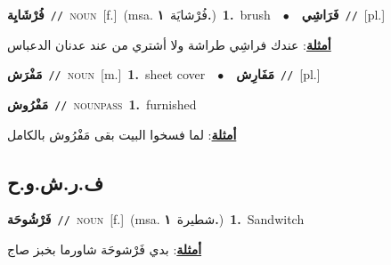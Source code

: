 \documentclass[10pt,a4paper,twoside]{article} %
\begin{document}
\begin{multicols}{2}
{\setlength\topsep{0pt}\textbf{\foreignlanguage{arabic}{فُرْشَايِة}}\ {\color{gray}\texttt{//}\color{black}}\ \textsc{noun}\ [f.]\ \color{gray}(msa. \foreignlanguage{arabic}{فُرْشايَة}~\foreignlanguage{arabic}{\textbf{١.}})\color{black}\ \textbf{1.}~brush\ \ $\bullet$\ \ \setlength\topsep{0pt}\textbf{\foreignlanguage{arabic}{فَرَاشِي}}\ {\color{gray}\texttt{//}\color{black}}\ [pl.]\  \begin{flushright}\color{gray}\foreignlanguage{arabic}{\textbf{\underline{\foreignlanguage{arabic}{أمثلة}}}: عندك فراشِي طراشة ولا أشتري من عند عدنان الدعباس}\end{flushright}\color{black}} \vspace{2mm}

{\setlength\topsep{0pt}\textbf{\foreignlanguage{arabic}{مَفْرَش}}\ {\color{gray}\texttt{//}\color{black}}\ \textsc{noun}\ [m.]\ \textbf{1.}~sheet cover\ \ $\bullet$\ \ \setlength\topsep{0pt}\textbf{\foreignlanguage{arabic}{مَفَارِش}}\ {\color{gray}\texttt{//}\color{black}}\ [pl.]\ } \vspace{2mm}

{\setlength\topsep{0pt}\textbf{\foreignlanguage{arabic}{مَفْرُوش}}\ {\color{gray}\texttt{//}\color{black}}\ \textsc{noun\textunderscore pass}\ \textbf{1.}~furnished\  \begin{flushright}\color{gray}\foreignlanguage{arabic}{\textbf{\underline{\foreignlanguage{arabic}{أمثلة}}}: لما فسخوا البيت بقى مَفْرُوش بالكامل}\end{flushright}\color{black}} \vspace{2mm}

\vspace{-3mm}
\subsection*{\color{blue}\foreignlanguage{arabic}{ف.ر.ش.و.ح}\color{blue}{ (ntws)}} 

{\setlength\topsep{0pt}\textbf{\foreignlanguage{arabic}{فَرْشُوحَة}}\ {\color{gray}\texttt{//}\color{black}}\ \textsc{noun}\ [f.]\ \color{gray}(msa. \foreignlanguage{arabic}{شطيرة}~\foreignlanguage{arabic}{\textbf{١.}})\color{black}\ \textbf{1.}~Sandwitch\  \begin{flushright}\color{gray}\foreignlanguage{arabic}{\textbf{\underline{\foreignlanguage{arabic}{أمثلة}}}: بدي فَرْشوحَة شاورما بخبز صاج}\end{flushright}\color{black}} \vspace{2mm}


\end{multicols}
\end{document}
